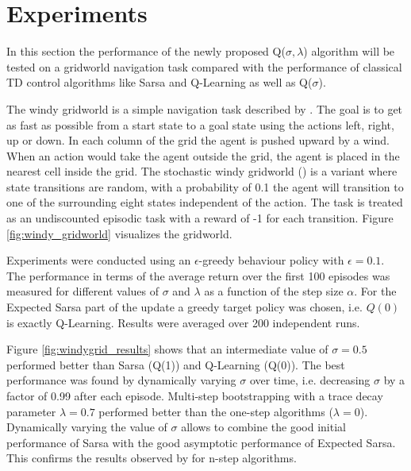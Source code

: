 \documentclass{article} %
\begin{document}
\section{Experiments}

In this section the performance of the newly proposed Q($\sigma, \lambda$) algorithm will be tested on a gridworld navigation task compared with the performance of classical TD control algorithms like Sarsa and Q-Learning as well as Q($\sigma$).


The windy gridworld is a simple navigation task described by \cite{sutton1998}. The goal is to get as fast as possible from a start state to a goal state using the actions left, right, up or down. In each column of the grid the agent is pushed upward by a wind. When an action would take the agent outside the grid, the agent is placed in the nearest cell inside the grid. The stochastic windy gridworld (\cite{deasis2017}) is a variant where state transitions are random, with a probability of 0.1 the agent will transition to one of the surrounding eight states independent of the action.
The task is treated as an undiscounted episodic task with a reward of -1 for each transition. Figure \ref{fig:windy_gridworld} visualizes the gridworld. 

Experiments were conducted using an $\epsilon$-greedy behaviour policy with $\epsilon = 0.1$. The performance in terms of the average return over the first 100 episodes was measured for different values of $\sigma$ and $\lambda$ as a function of the step size $\alpha$. For the Expected Sarsa part of the update a greedy target policy was chosen, i.e. $Q(0)$ is exactly Q-Learning. Results were averaged over 200 independent runs.

Figure \ref{fig:windygrid_results} shows that an intermediate value of $\sigma = 0.5$ performed better than Sarsa (Q(1)) and Q-Learning (Q(0)). The best performance was found by dynamically varying $\sigma$ over time, i.e. decreasing $\sigma$ by a factor of 0.99 after each episode. Multi-step bootstrapping with a trace decay parameter $\lambda = 0.7$ performed better than the one-step algorithms ($\lambda = 0$). Dynamically varying the value of $\sigma$ allows to combine the good initial performance of Sarsa with the good asymptotic performance of Expected Sarsa. This confirms the results observed by \cite{deasis2017} for n-step algorithms.
\end{document}
